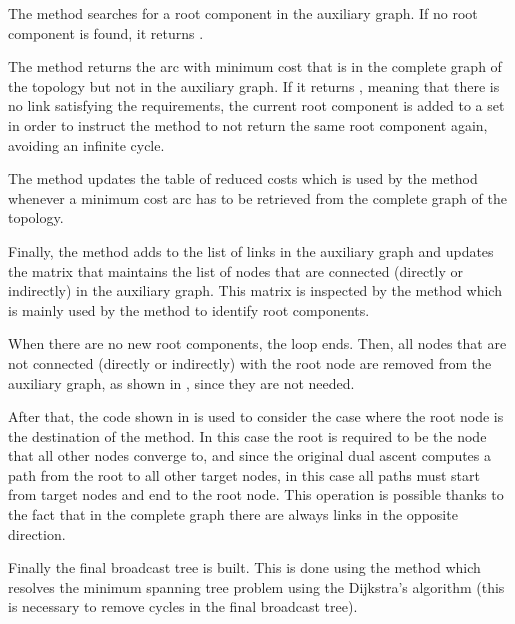 The  method searches for a root component in the auxiliary
graph. If no root component is found, it returns .

The  method returns the arc with minimum cost that is in the
complete graph of the topology but not in the auxiliary graph. If it returns
, meaning that there is no link satisfying the requirements, the
current root component is added to a set in order to instruct the
 method to not return the same root component again, avoiding
an infinite cycle.

The  method updates the table of reduced costs which is used by
the  method whenever a minimum cost arc has to be retrieved
from the complete graph of the topology.

Finally, the  method adds  to the list of links in
the auxiliary graph and updates the  matrix that maintains the
list of nodes that are connected (directly or indirectly) in the auxiliary
graph. This matrix is inspected by the  method which is
mainly used by the  method to identify root components.

When there are no new root components, the loop ends. Then, all nodes that are
not connected (directly or indirectly) with the root node are removed from the
auxiliary graph, as shown in , since they are
not needed.



After that, the code shown in  is used to
consider the case where the root node is the destination of the
 method. In this case the root is required to be the node that
all other nodes converge to, and since the original dual ascent computes a path
from the root to all other target nodes, in this case all paths must start from
target nodes and end to the root node. This operation is possible thanks to the
fact that in the complete graph there are always links in the opposite
direction.



Finally the final broadcast tree is built. This is done using the method
 which resolves the minimum spanning tree problem using
the Dijkstra's algorithm (this is necessary to remove cycles in the final
broadcast tree).
